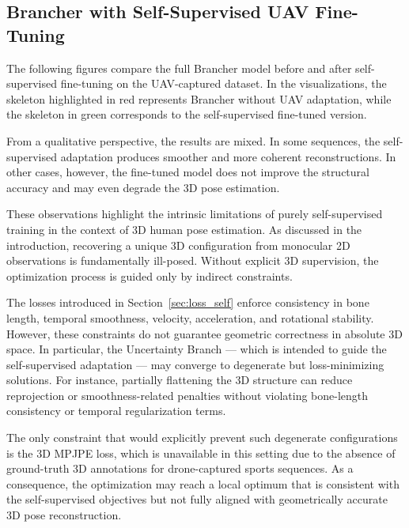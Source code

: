 \subsection*{Brancher with Self-Supervised UAV Fine-Tuning}
The following figures compare the full Brancher model before and after self-supervised fine-tuning on the UAV-captured dataset. In the visualizations, the skeleton highlighted in {\color{red}red} 
represents Brancher without UAV adaptation, while the skeleton in {\color{green}green} corresponds to the self-supervised fine-tuned version.

From a qualitative perspective, the results are mixed. In some sequences, the self-supervised adaptation produces smoother and more coherent reconstructions. In other cases, however, the fine-tuned model 
does not improve the structural accuracy and may even degrade the 3D pose estimation.

These observations highlight the intrinsic limitations of purely self-supervised training in the context of 3D human pose estimation. As discussed in the introduction, recovering a unique 3D configuration 
from monocular 2D observations is fundamentally ill-posed. Without explicit 3D supervision, the optimization process is guided only by indirect constraints.

The losses introduced in Section~\ref{sec:loss_self} enforce consistency in bone length, temporal smoothness, velocity, acceleration, and rotational stability. However, these constraints do not guarantee 
geometric correctness in absolute 3D space. In particular, the Uncertainty Branch — which is intended to guide the self-supervised adaptation — may converge to degenerate but loss-minimizing solutions. For 
instance, partially flattening the 3D structure can reduce reprojection or smoothness-related penalties without violating bone-length consistency or temporal regularization terms.

The only constraint that would explicitly prevent such degenerate configurations is the 3D MPJPE loss, which is unavailable in this setting due to the absence of ground-truth 3D annotations for 
drone-captured sports sequences. As a consequence, the optimization may reach a local optimum that is consistent with the self-supervised objectives but not fully aligned with geometrically accurate 3D pose 
reconstruction.

